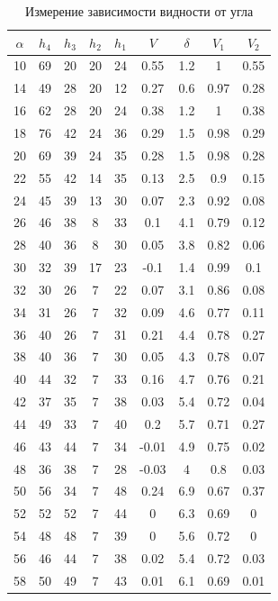 \documentclass[12pt]{kiarticle} %
\begin{document}
\begin{table}[h!]
	\caption{Измерение зависимости видности от угла}
	\begin{center}
		\begin{tabular}{|c|c|c|c|c|c|c|c|c|}
			\hline
			$ 	\alpha  $ & $ h_4 $ &  $ h_3 $& $ h_2 $ & $ h_1 $ & $ V $ & $  \delta  $ & $ V_1 $ & $ V_2 $ \\
			\hline
		10 & 69 & 20 & 20 & 24 & 0.55 & 1.2 & 1 & 0.55 \\
		14 & 49 & 28 & 20 & 12 & 0.27 & 0.6 & 0.97 & 0.28 \\
		16 & 62 & 28 & 20 & 24 & 0.38 & 1.2 & 1 & 0.38 \\
		18 & 76 & 42 & 24 & 36 & 0.29 & 1.5 & 0.98 & 0.29 \\
		20 & 69 & 39 & 24 & 35 & 0.28 & 1.5 & 0.98 & 0.28 \\
		22 & 55 & 42 & 14 & 35 & 0.13 & 2.5 & 0.9 & 0.15 \\
		24 & 45 & 39 & 13 & 30 & 0.07 & 2.3 & 0.92 & 0.08 \\
		26 & 46 & 38 & 8 & 33 & 0.1 & 4.1 & 0.79 & 0.12 \\
		28 & 40 & 36 & 8 & 30 & 0.05 & 3.8 & 0.82 & 0.06 \\
		30 & 32 & 39 & 17 & 23 & -0.1 & 1.4 & 0.99 & 0.1 \\
		32 & 30 & 26 & 7 & 22 & 0.07 & 3.1 & 0.86 & 0.08 \\
		34 & 31 & 26 & 7 & 32 & 0.09 & 4.6 & 0.77 & 0.11 \\
		36 & 40 & 26 & 7 & 31 & 0.21 & 4.4 & 0.78 & 0.27 \\
		38 & 40 & 36 & 7 & 30 & 0.05 & 4.3 & 0.78 & 0.07 \\
		40 & 44 & 32 & 7 & 33 & 0.16 & 4.7 & 0.76 & 0.21 \\
		42 & 37 & 35 & 7 & 38 & 0.03 & 5.4 & 0.72 & 0.04 \\
		44 & 49 & 33 & 7 & 40 & 0.2 & 5.7 & 0.71 & 0.27 \\
		46 & 43 & 44 & 7 & 34 & -0.01 & 4.9 & 0.75 & 0.02 \\
		48 & 36 & 38 & 7 & 28 & -0.03 & 4 & 0.8 & 0.03 \\
		50 & 56 & 34 & 7 & 48 & 0.24 & 6.9 & 0.67 & 0.37 \\
		52 & 52 & 52 & 7 & 44 & 0 & 6.3 & 0.69 & 0 \\
		54 & 48 & 48 & 7 & 39 & 0 & 5.6 & 0.72 & 0 \\
		56 & 46 & 44 & 7 & 38 & 0.02 & 5.4 & 0.72 & 0.03 \\
		58 & 50 & 49 & 7 & 43 & 0.01 & 6.1 & 0.69 & 0.01 \\

\end{tabular}
\end{center}
\end{table}
\end{document}
